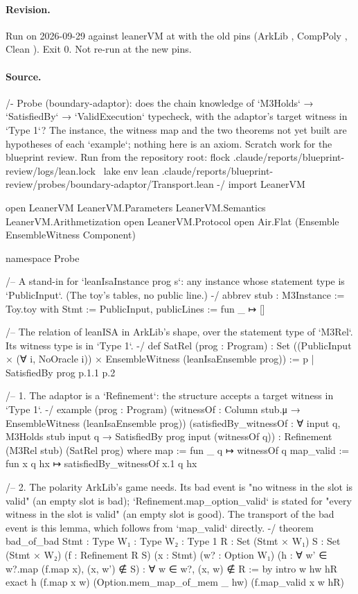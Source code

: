 \paragraph{Revision.} Run on 2026-09-29 against leanerVM  at  with the old pins (ArkLib , CompPoly , Clean ). Exit 0. Not re-run at the new pins.

\paragraph{Source.}
\begin{leancode}[numbers=left,numbersep=3pt]
/-
  Probe (boundary-adaptor): does the chain
    knowledge of `M3Holds`  →  `SatisfiedBy`  →  `ValidExecution`
  typecheck, with the adaptor's target witness in `Type 1`?
  The instance, the witness map and the two theorems not yet built are hypotheses of each
  `example`; nothing here is an axiom. Scratch work for the blueprint review.
  Run from the repository root:
    flock .claude/reports/blueprint-review/logs/lean.lock \
      lake env lean .claude/reports/blueprint-review/probes/boundary-adaptor/Transport.lean
-/
import LeanerVM

open LeanerVM LeanerVM.Parameters LeanerVM.Semantics LeanerVM.Arithmetization
open LeanerVM.Protocol
open Air.Flat (Ensemble EnsembleWitness Component)

namespace Probe

/-- A stand-in for `leanIsaInstance prog s`: any instance whose statement type is
`PublicInput`. (The toy's tables, no public line.) -/
abbrev stub : M3Instance :=
  { Toy.toy with Stmt := PublicInput, publicLines := fun _ ↦ [] }

/-- The relation of leanISA in ArkLib's shape, over the statement type of `M3Rel`. Its witness
type is in `Type 1`. -/
def SatRel (prog : Program) :
    Set ((PublicInput × (∀ i, NoOracle i)) × EnsembleWitness (leanIsaEnsemble prog)) :=
  {p | SatisfiedBy prog p.1.1 p.2}

/-- 1. The adaptor is a `Refinement`: the structure accepts a target witness in `Type 1`. -/
example (prog : Program) (witnessOf : Column stub.μ → EnsembleWitness (leanIsaEnsemble prog))
    (satisfiedBy_witnessOf :
      ∀ input q, M3Holds stub input q → SatisfiedBy prog input (witnessOf q)) :
    Refinement (M3Rel stub) (SatRel prog) where
  map := fun _ q ↦ witnessOf q
  map_valid := fun x q hx ↦ satisfiedBy_witnessOf x.1 q hx

/-- 2. The polarity ArkLib's game needs. Its bad event is "no witness in the slot is valid"
(an empty slot is bad); `Refinement.map_option_valid` is stated for "every witness in the slot
is valid" (an empty slot is good). The transport of the bad event is this lemma, which follows
from `map_valid` directly. -/
theorem bad_of_bad {Stmt : Type} {W₁ : Type} {W₂ : Type 1} {R : Set (Stmt × W₁)}
    {S : Set (Stmt × W₂)} (f : Refinement R S) (x : Stmt) (w? : Option W₁)
    (h : ∀ w' ∈ w?.map (f.map x), (x, w') ∉ S) : ∀ w ∈ w?, (x, w) ∉ R := by
  intro w hw hR
  exact h (f.map x w) (Option.mem_map_of_mem _ hw) (f.map_valid x w hR)


\end{leancode}
